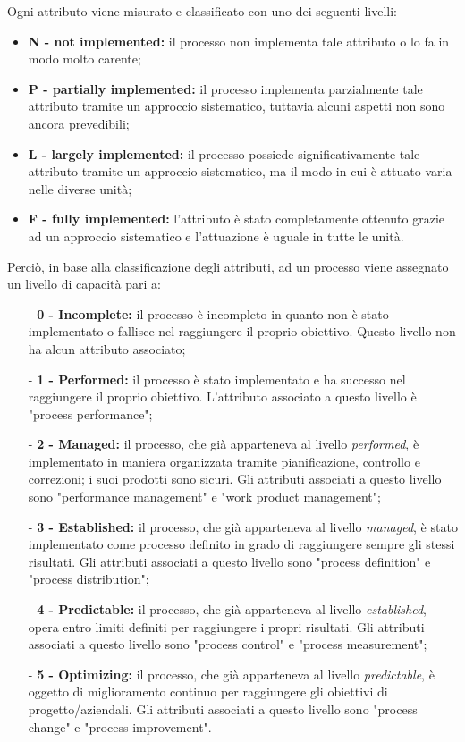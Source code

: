 Ogni attributo viene misurato e classificato con uno dei seguenti livelli:
\begin{itemize}
	\item \textbf{N - not implemented:} il processo non implementa tale attributo o lo fa in modo molto carente;
	\item \textbf{P - partially implemented:} il processo implementa parzialmente tale attributo 
		tramite un approccio sistematico, tuttavia alcuni aspetti non sono ancora prevedibili;
	\item \textbf{L - largely implemented:} il processo possiede significativamente tale attributo 
		tramite un approccio sistematico, ma il modo in cui è attuato varia nelle diverse unità;
	\item \textbf{F - fully implemented:} l'attributo è stato completamente ottenuto grazie ad un approccio sistematico 
		e l'attuazione è uguale in tutte le unità.
\end{itemize}
Perciò, in base alla classificazione degli attributi, ad un processo viene assegnato un livello di capacità pari a:
\begin{itemize}
	\item[-] \textbf{0 - Incomplete:} il processo è incompleto in quanto non è stato implementato o 
		fallisce nel raggiungere il proprio	obiettivo. Questo livello non ha alcun attributo associato;
	\item[-] \textbf{1 - Performed:} il processo è stato implementato e ha successo nel raggiungere il proprio obiettivo.
		L'attributo associato a questo livello è "process performance";
	\item[-] \textbf{2 - Managed:} il processo, che già apparteneva al livello \textit{performed}, è implementato in 
		maniera organizzata tramite pianificazione, controllo e correzioni; i suoi prodotti sono sicuri.
		Gli attributi associati a questo livello sono "performance management" e "work product management";
	\item[-] \textbf{3 - Established:} il processo, che già apparteneva al livello \textit{managed},
		è stato implementato come processo definito in grado di raggiungere sempre gli stessi risultati.
		Gli attributi associati a questo livello sono "process definition" e "process distribution";
	\item[-] \textbf{4 - Predictable:} il processo, che già apparteneva al livello \textit{established},
		opera entro limiti definiti per raggiungere i propri risultati.
		Gli attributi associati a questo livello sono "process control" e "process measurement";
	\item[-] \textbf{5 - Optimizing:} il processo, che già apparteneva al livello \textit{predictable},
		è oggetto di miglioramento continuo per raggiungere gli obiettivi di progetto/aziendali.
		Gli attributi associati a questo livello sono "process change" e "process improvement".
\end{itemize}
